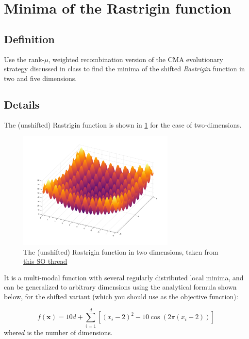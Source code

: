 \documentclass[11pt]{article}
\begin{document}
\section{Minima of the Rastrigin function}
\label{sec:org8c3ac75}
\subsection{Definition}
\label{sec:orgcbad40b}
  Use the rank-\(\mu\), weighted recombination version of the CMA
evolutionary strategy discussed in class to find the minima of the shifted
\emph{Rastrigin} function in two and five dimensions.

\subsection{Details}
\label{sec:org0a81697}
The (unshifted) Rastrigin function is shown in \cref{rastr} for the case of two-dimensions.

\begin{figure}[htbp]
\centering
\includegraphics[width=0.7\textwidth]{images/rastrigin.png}
\caption{\label{rastr}
The (unshifted) Rastrigin function in two dimensions, taken from \href{https://stackoverflow.com/a/43112733}{this SO thread}}
\end{figure}

It is a multi-modal function with several regularly distributed local minima,
and can be generalized to arbitrary dimensions using the analytical formula
shown below, for the shifted variant (which you should use as the objective
function):

\begin{equation}
f(\mathbf{x}) = 10d + \sum_{i=1}^{d} \left[ (x_i - 2)^2 - 10 \cos\left(2 \pi (x_i - 2) \right) \right]
\end{equation}
where\(d\) is the number of dimensions.
\end{document}

